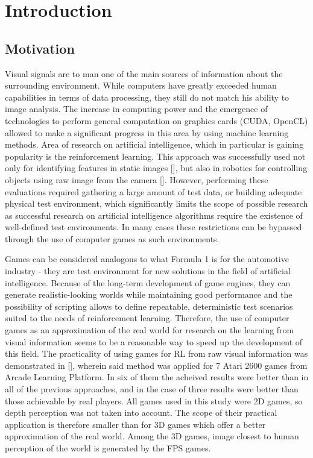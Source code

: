 
\chapter{Introduction}
\label{ch:introduction}
\section{Motivation}


Visual signals are to man one of the main sources of information about the surrounding environment.
While computers have greatly exceeded human capabilities in terms of data processing, they still do not match his ability to image analysis.
The increase in computing power and the emergence of technologies to perform general computation on graphics cards (CUDA, OpenCL) allowed to make a significant progress in this area by using machine learning methods.
Area of research on artificial intelligence, which in particular is gaining popularity is the reinforcement learning.
This approach was successfully used not only for identifying features in static images [], but also in robotics for controlling objects using raw image from the camera [].
However, performing these evaluations required gathering a large amount of test data, or building adequate physical test environment, which significantly limits the scope of possible research as
successful research on artificial intelligence algorithms require the existence of well-defined test environments.
In many cases these restrictions can be bypassed through the use of computer games as such environments.


Games can be considered analogous to what Formula 1 is for the automotive industry - they are test environment for new solutions in the field of artificial intelligence.
Because of the long-term development of game engines, they can generate realistic-looking worlds while maintaining good performance and
the possibility of scripting allows to define repeatable, deterministic test scenarios suited to the needs of reinforcement learning.
Therefore, the use of computer games as an approximation of the real world for research on the learning from visual information seems to be a reasonable way to speed up the development of this field. 
The practicality of using games for RL from raw visual information was demonstrated in [], wherein said method was applied for 7 Atari 2600 games from Arcade Learning Platform.
 In six of them the acheived results were better than in all of the previous approaches, and in the case of three results were better than those achievable by real players.
All games used in this study were 2D games, so depth perception was not taken into account.
The scope of their practical application is therefore smaller than for 3D games which offer a better approximation of the real world.
Among the 3D games, image closest to human perception of the world is generated by the FPS games.


